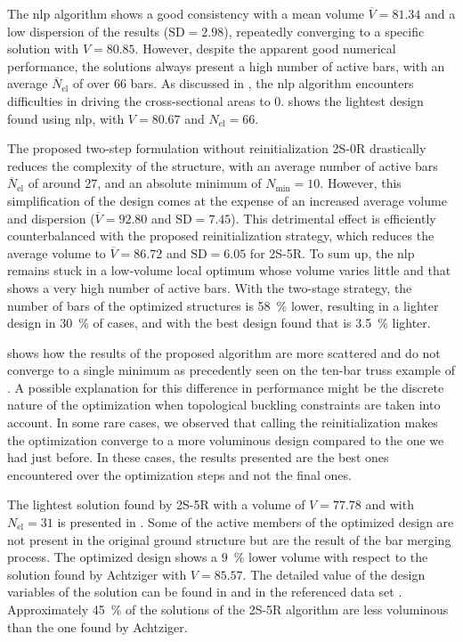 The \gls{nlp} algorithm shows a good consistency with a mean volume $\overline{V}=81.34$ and a low dispersion of the results ($\text{SD}=2.98$), repeatedly converging to a specific solution with $V=80.85$. However, despite the apparent good numerical performance, the solutions always present a high number of active bars, with an average $\overline{N}_{\text{el}}$ of over 66 bars. As discussed in , the \gls{nlp} algorithm encounters difficulties in driving the cross-sectional areas to 0.  shows the lightest design found using \gls{nlp}, with $V = 80.67$ and $N_{\text{el}}=66$.

The proposed two-step formulation without reinitialization 2S-0R drastically reduces the complexity of the structure, with an average number of active bars $\overline{N}_{\text{el}}$ of around 27, and an absolute minimum of $N_{\text{min}}=10$. However, this simplification of the design comes at the expense of an increased average volume and dispersion ($\overline{V}=92.80$ and $\text{SD}=7.45$). This detrimental effect is efficiently counterbalanced with the proposed reinitialization strategy, which reduces the average volume to $\overline{V}=86.72$ and $\text{SD}=6.05$ for 2S-5R. To sum up, the \gls{nlp} remains stuck in a low-volume local optimum whose volume varies little and that shows a very high number of active bars. With the two-stage strategy, the number of bars of the optimized structures is \qty{58}{\%} lower, resulting in a lighter design in \qty{30}{\%} of cases, and with the best design found that is \qty{3.5}{\%} lighter.

 shows how the results of the proposed algorithm are more scattered and do not converge to a single minimum as precedently seen on the ten-bar truss example of . A possible explanation for this difference in performance might be the discrete nature of the optimization when topological buckling constraints are taken into account. In some rare cases, we observed that calling the reinitialization makes the optimization converge to a more voluminous design compared to the one we had just before. In these cases, the results presented are the best ones encountered over the optimization steps and not the final ones.

The lightest solution found by 2S-5R with a volume of $V=77.78$ and with $N_{\text{el}}=31$ is presented in . Some of the active members of the optimized design are not present in the original ground structure but are the result of the bar merging process. The optimized design shows a \qty{9}{\%} lower volume with respect to the solution found by Achtziger  with $V=85.57$. The detailed value of the design variables of the solution can be found in  and in the referenced data set . Approximately \qty{45}{\%} of the solutions of the 2S-5R algorithm are less voluminous than the one found by Achtziger.

